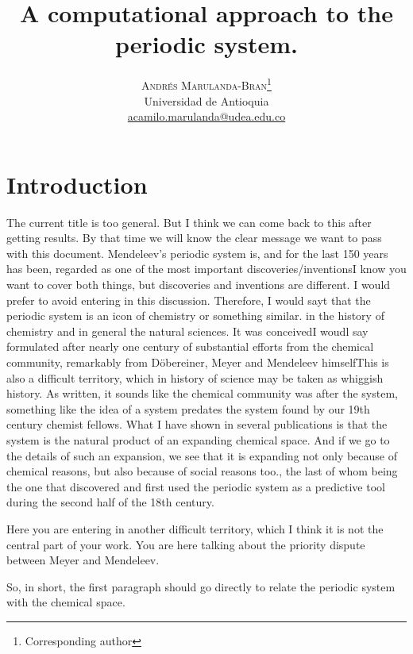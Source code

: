 \documentclass[]{article}
\newcommand{\gr}[1]{{\color{red}#1}}
\begin{document}
\title{A computational approach to the periodic system.}

\author{%
\textsc{Andr\'es Marulanda-Bran}\thanks{Corresponding author} \\[1ex]
\normalsize Universidad de Antioquia \\ %
\normalsize \href{mailto:correoAndres}{acamilo.marulanda@udea.edu.co} %
}


\maketitle


\section{Introduction}
\label{sec:intro}
\gr{The current title is too general.  But I think we can come back to this after getting results.  By that time we will know the clear message we want to pass with this document.}
Mendeleev's periodic system is, and for the last 150 years has been, regarded as one of the most important discoveries/inventions\gr{I know you want to cover both things, but discoveries and inventions are different.  I would prefer to avoid entering in this discussion.  Therefore, I would sayt that the periodic system is an icon of chemistry or something similar.} in the history of chemistry and in general the natural sciences. It was conceived\gr{I woudl say formulated} after nearly one century of substantial efforts from the chemical community, remarkably from D\"obereiner, Meyer and Mendeleev himself\gr{This is also a difficult territory, which in history of science may be taken as whiggish history.  As written, it sounds like the chemical community was after the system, something like the idea of a system predates the system found by our 19th century chemist fellows.  What I have shown in several publications is that the system is the natural product of an expanding chemical space.  And if we go to the details of such an expansion, we see that it is expanding not only because of chemical reasons, but also because of social reasons too.}, the last of whom being the one that discovered and first used the periodic system as a predictive tool during the second half of the 18th century.\gr{Here you are entering in another difficult territory, which I think it is not the central part of your work.  You are here talking about the priority dispute between Meyer and Mendeleev.

So, in short, the first paragraph should go directly to relate the periodic system with the chemical space.}
\end{document}
